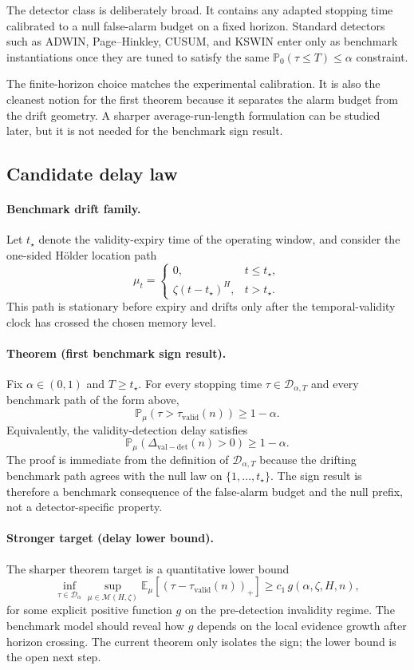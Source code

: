 The detector class is deliberately broad. It contains any adapted stopping time
calibrated to a null false-alarm budget on a fixed horizon. Standard detectors
such as ADWIN, Page--Hinkley, CUSUM, and KSWIN enter only as benchmark
instantiations once they are tuned to satisfy the same $\mathbb P_0(\tau \le T)
\le \alpha$ constraint.

The finite-horizon choice matches the experimental calibration. It is also the
cleanest notion for the first theorem because it separates the alarm budget from
the drift geometry. A sharper average-run-length formulation can be studied
later, but it is not needed for the benchmark sign result.

\subsection{Candidate delay law}

\paragraph{Benchmark drift family.}
Let $t_\star$ denote the validity-expiry time of the operating window, and
consider the one-sided H\"older location path
\[
  \mu_t =
  \begin{cases}
    0, & t \le t_\star, \\
    \zeta (t - t_\star)^H, & t > t_\star.
  \end{cases}
\]
This path is stationary before expiry and drifts only after the temporal-validity
clock has crossed the chosen memory level.

\paragraph{Theorem (first benchmark sign result).}
Fix $\alpha \in (0,1)$ and $T \ge t_\star$. For every stopping time
$\tau \in \mathcal D_{\alpha,T}$ and every benchmark path of the form above,
\[
  \mathbb P_\mu\!\left(\tau > \tau_{\mathrm{valid}}(n)\right)
  \ge 1 - \alpha.
\]
Equivalently, the validity-detection delay satisfies
\[
  \mathbb P_\mu\!\left(\Delta_{\mathrm{val-det}}(n) > 0\right)
  \ge 1 - \alpha.
\]
The proof is immediate from the definition of $\mathcal D_{\alpha,T}$ because
the drifting benchmark path agrees with the null law on $\{1,\dots,t_\star\}$.
The sign result is therefore a benchmark consequence of the false-alarm budget
and the null prefix, not a detector-specific property.

\paragraph{Stronger target (delay lower bound).}
The sharper theorem target is a quantitative lower bound
\[
  \inf_{\tau \in \mathcal D_\alpha}
  \sup_{\mu \in \mathcal M(H,\zeta)}
  \mathbb E_\mu\!\left[(\tau - \tau_{\mathrm{valid}}(n))_+\right]
  \ge c_1 \, g(\alpha,\zeta,H,n),
\]
for some explicit positive function $g$ on the pre-detection invalidity regime.
The benchmark model should reveal how $g$ depends on the local evidence growth
after horizon crossing. The current theorem only isolates the sign; the lower
bound is the open next step.


